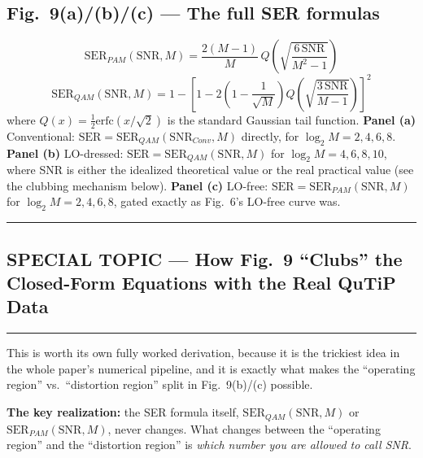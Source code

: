 \documentclass[11pt]{article}
\begin{document}
\subsection*{Fig.~9(a)/(b)/(c) --- The full SER formulas}
\[
\boxed{\text{SER}_{PAM}(\text{SNR},M) = \frac{2(M-1)}{M}\,Q\!\left(\sqrt{\frac{6\,\text{SNR}}{M^2-1}}\right)}
\]
\[
\boxed{\text{SER}_{QAM}(\text{SNR},M) = 1-\left[1-2\left(1-\frac1{\sqrt M}\right)Q\!\left(\sqrt{\frac{3\,\text{SNR}}{M-1}}\right)\right]^2}
\]
where $Q(x)=\tfrac12\text{erfc}(x/\sqrt2)$ is the standard Gaussian tail function. \textbf{Panel (a)} Conventional: $\text{SER}=\text{SER}_{QAM}(\text{SNR}_{Conv},M)$ directly, for $\log_2M=2,4,6,8$. \textbf{Panel (b)} LO-dressed: $\text{SER}=\text{SER}_{QAM}(\text{SNR},M)$ for $\log_2M=4,6,8,10$, where SNR is either the idealized theoretical value or the real practical value (see the clubbing mechanism below). \textbf{Panel (c)} LO-free: $\text{SER}=\text{SER}_{PAM}(\text{SNR},M)$ for $\log_2M=2,4,6,8$, gated exactly as Fig.~6's LO-free curve was.

\bigskip\noindent\rule{\linewidth}{1.2pt}
\subsection*{\Large SPECIAL TOPIC --- How Fig.~9 ``Clubs'' the Closed-Form Equations with the Real QuTiP Data}
\noindent\rule{\linewidth}{0.4pt}\medskip
This is worth its own fully worked derivation, because it is the trickiest idea in the whole paper's numerical pipeline, and it is exactly what makes the ``operating region'' vs.\ ``distortion region'' split in Fig.~9(b)/(c) possible.

\textbf{The key realization:} the SER formula itself, $\text{SER}_{QAM}(\text{SNR},M)$ or $\text{SER}_{PAM}(\text{SNR},M)$, never changes. What changes between the ``operating region'' and the ``distortion region'' is \emph{which number you are allowed to call SNR}.
\end{document}
